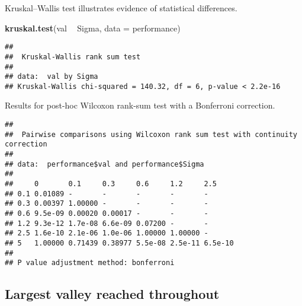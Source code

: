 \documentclass[]{book}
\newenvironment{Shaded}{\begin{snugshade}}{\end{snugshade}}
\newcommand{\DataTypeTok}[1]{\textcolor[rgb]{0.13,0.29,0.53}{#1}}
\newcommand{\KeywordTok}[1]{\textcolor[rgb]{0.13,0.29,0.53}{\textbf{#1}}}
\newcommand{\NormalTok}[1]{#1}
\newcommand{\OperatorTok}[1]{\textcolor[rgb]{0.81,0.36,0.00}{\textbf{#1}}}
\newcommand{\OtherTok}[1]{\textcolor[rgb]{0.56,0.35,0.01}{#1}}
\newcommand{\StringTok}[1]{\textcolor[rgb]{0.31,0.60,0.02}{#1}}
\begin{document}
Kruskal--Wallis test illustrates evidence of statistical differences.

\begin{Shaded}
\begin{Highlighting}[]
\KeywordTok{kruskal.test}\NormalTok{(val }\OperatorTok{~}\StringTok{ }\NormalTok{Sigma, }\DataTypeTok{data =}\NormalTok{ performance)}
\end{Highlighting}
\end{Shaded}

\begin{verbatim}
## 
##  Kruskal-Wallis rank sum test
## 
## data:  val by Sigma
## Kruskal-Wallis chi-squared = 140.32, df = 6, p-value < 2.2e-16
\end{verbatim}

Results for post-hoc Wilcoxon rank-sum test with a Bonferroni correction.

\begin{Shaded}
\end{Shaded}

\begin{verbatim}
## 
##  Pairwise comparisons using Wilcoxon rank sum test with continuity correction 
## 
## data:  performance$val and performance$Sigma 
## 
##     0       0.1     0.3     0.6     1.2     2.5    
## 0.1 0.01089 -       -       -       -       -      
## 0.3 0.00397 1.00000 -       -       -       -      
## 0.6 9.5e-09 0.00020 0.00017 -       -       -      
## 1.2 9.3e-12 1.7e-08 6.6e-09 0.07200 -       -      
## 2.5 1.6e-10 2.1e-06 1.0e-06 1.00000 1.00000 -      
## 5   1.00000 0.71439 0.38977 5.5e-08 2.5e-11 6.5e-10
## 
## P value adjustment method: bonferroni
\end{verbatim}

\hypertarget{largest-valley-reached-throughout-13}{%
\subsection{Largest valley reached throughout}\label{largest-valley-reached-throughout-13}}
\end{document}

